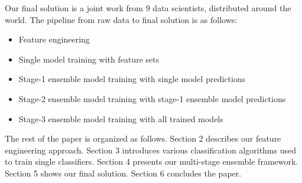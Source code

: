 Our final solution is a joint work from 9 data scientists, distributed around the world.
The pipeline from raw data to final solution is as follows:
\begin{itemize}
  \setlength\itemsep{0em}
  \item Feature engineering
  \item Single model training with feature sets
  \item Stage-1 ensemble model training with single model predictions
  \item Stage-2 ensemble model training with stage-1 ensemble model predictions
  \item Stage-3 ensemble model training with all trained models
\end{itemize}

The rest of the paper is organized as follows. Section 2 describes our feature engineering approach. Section 3 introduces various classification algorithms used to train single classifiers. Section 4 presents our multi-stage ensemble framework. Section 5 shows our final solution. Section 6 concludes the paper.

